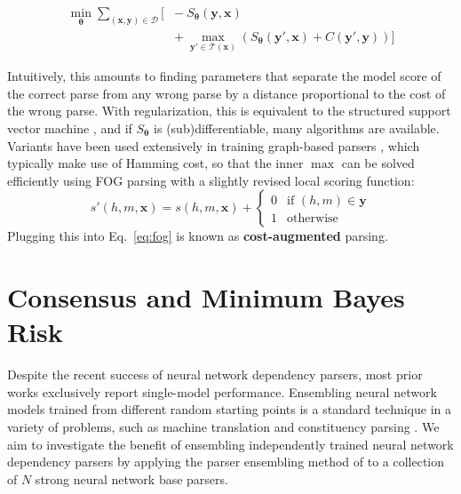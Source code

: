 \documentclass[11pt,letterpaper]{article}
\newcommand{\ignore}[1]{}
\newcommand{\adhicomment}[1]{\ignore{\textcolor{green}{{\textbf{[#1 --\textsc{adhi}]}}}}}
\newcommand{\lingpengcomment}[1]{\ignore{\textcolor{green}{{\textbf{[#1 --\textsc{lpk}]}}}}}
\newcommand{\nascomment}[1]{\ignore{\textcolor{blue}{{\textbf{[#1 --\textsc{nas}]}}}}}
\begin{document}
\begin{align}
\min_{\boldsymbol{\theta}} \sum_{(\boldsymbol{x}, \boldsymbol{y}) \in \mathcal{D}} [ & -\ S_{\boldsymbol{\theta}}(\boldsymbol{y}, \boldsymbol{x}) \nonumber \\
 & +\ \max_{\boldsymbol{y'} \in \mathcal{T}(\boldsymbol{x})}\left(  S_{\boldsymbol{\theta}}(\boldsymbol{y'}, \boldsymbol{x}) + C(\boldsymbol{y'}, \boldsymbol{y})\right)]
 \label{eq:hinge}
 \end{align}
\ignore{\lingpengcomment{I put the neg first... I think this way is clear in format, if it is impossible to put everything in a single line.}}
Intuitively, this amounts to finding parameters that separate the model score of the correct parse from any wrong parse by a distance proportional to the cost of the wrong parse.
With regularization, this is equivalent to the structured support vector machine \cite{taskar,tsochantaridis}, \ignore{\nascomment{missing cites}}and if $S_{\boldsymbol{\theta}}$ is (sub)differentiable, many algorithms are available.
Variants have been used extensively in training graph-based parsers \cite{nonprojective_mcdonald,martins-09}, which typically
make use of Hamming cost, so that the inner $\max$ can be solved efficiently using FOG parsing with a slightly revised local scoring function:
\begin{equation}
s'(h, m, \boldsymbol{x})  = s(h, m, \boldsymbol{x}) + \left\{ \begin{array}{ll} 0 & \mbox{if $(h,m) \in \boldsymbol{y}$} \\ 1 & \mbox{otherwise} \end{array} \right.
\end{equation}
Plugging this into Eq.~\ref{eq:fog} is known as \textbf{cost-augmented} parsing.

\section{Consensus and Minimum Bayes Risk}\label{sec:mbr}

Despite the recent success of neural network dependency parsers, most prior works exclusively report single-model performance. Ensembling neural network models trained from different random starting points is a standard technique in a variety of problems, such as machine translation \cite{seq_to_seq} and constituency parsing \cite{grammar_foreign}. We aim to investigate the benefit of ensembling independently trained neural network dependency parsers by applying the parser ensembling method of  to a collection of $N$ strong neural network base parsers. \adhicomment{Added some sentences as a more gentle introduction to ensembling}
\end{document}
